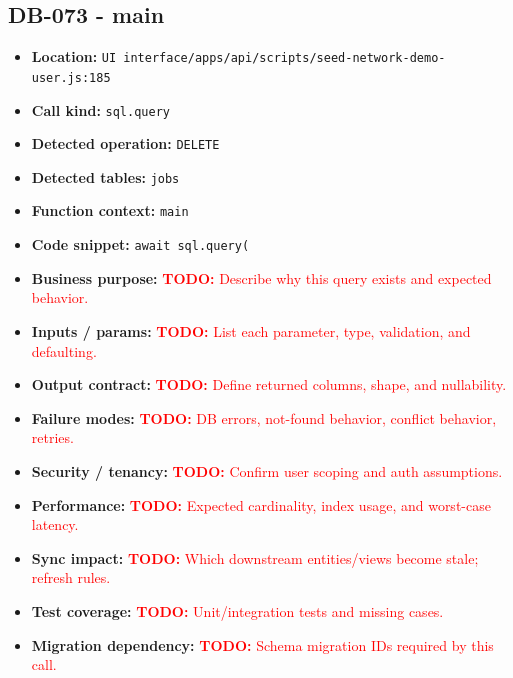 \documentclass[11pt]{article}
\newcommand{\todoitem}[1]{\textcolor{red}{\textbf{TODO:} #1}}
\begin{document}
\subsection{DB-073 - main}
\begin{itemize}[leftmargin=1.5em]
\item \textbf{Location:} \texttt{UI interface/apps/api/scripts/seed-network-demo-user.js:185}
\item \textbf{Call kind:} \texttt{sql.query}
\item \textbf{Detected operation:} \texttt{DELETE}
\item \textbf{Detected tables:} \texttt{jobs}
\item \textbf{Function context:} \texttt{main}
\item \textbf{Code snippet:} \texttt{await sql.query(}
\item \textbf{Business purpose:} \todoitem{Describe why this query exists and expected behavior.}
\item \textbf{Inputs / params:} \todoitem{List each parameter, type, validation, and defaulting.}
\item \textbf{Output contract:} \todoitem{Define returned columns, shape, and nullability.}
\item \textbf{Failure modes:} \todoitem{DB errors, not-found behavior, conflict behavior, retries.}
\item \textbf{Security / tenancy:} \todoitem{Confirm user scoping and auth assumptions.}
\item \textbf{Performance:} \todoitem{Expected cardinality, index usage, and worst-case latency.}
\item \textbf{Sync impact:} \todoitem{Which downstream entities/views become stale; refresh rules.}
\item \textbf{Test coverage:} \todoitem{Unit/integration tests and missing cases.}
\item \textbf{Migration dependency:} \todoitem{Schema migration IDs required by this call.}
\end{itemize}
\end{document}
